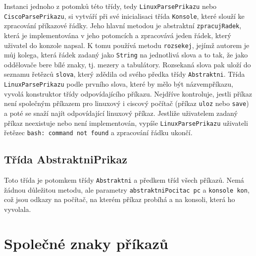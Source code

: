 Instanci jednoho z potomků této třídy, tedy \verb|LinuxParsePrikazu| nebo \verb|CiscoParsePrikazu|, si vytváří při své inicialisaci třída \verb|Konsole|, které slouží ke zpracování příkazové řádky. Jeho hlavní metodou je abstraktní \verb|zpracujRadek|, která je implementována v jeho potomcích a zpracovává jeden řádek, který uživatel do konzole napsal. K tomu používá metodu \verb|rozsekej|, jejímž autorem je můj kolega, která řádek zadaný jako \verb|String|  na jednotlivá slova a to tak, že jako oddělovače bere bílé znaky, tj. mezery a tabulátory. Rozsekaná slova pak uloží do seznamu řetězců \verb|slova|, který zdědila od svého předka třídy \verb|Abstraktni|. Třída \verb|LinuxParsePrikazu| podle prvního slova, které by mělo být názvempříkazu, vyvolá konstruktor třídy odpovídajícího příkazu. Nejdříve kontroluje, jestli příkaz není společným příkazem pro linuxový i ciscový počítač (příkaz \verb|uloz| nebo \verb|save|) a poté se snaží najít odpovídající linuxový příkaz. Jestliže uživatelem zadaný příkaz neexistuje nebo není implementován, vypíše \verb|LinuxParsePrikazu| uživateli řetězec \verb|bash: command not found| a zpracování řádku ukončí.


\subsection{Třída AbstraktniPrikaz}

Toto třída je potomkem třídy \verb|Abstraktni| a předkem tříd všech příkazů. Nemá žádnou důležitou metodu, ale parametry \verb|abstraktniPocitac pc| a \verb|konsole kon|, což jsou odkazy na počítač, na kterém příkaz probíhá a na konsoli, která ho vyvolala.




\section{Společné znaky příkazů}

